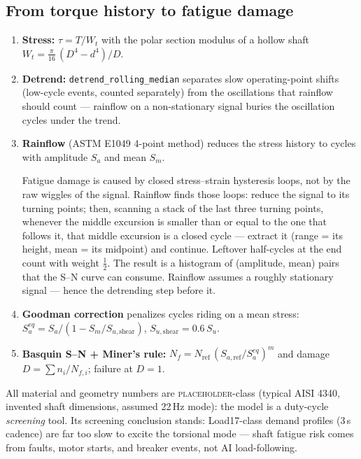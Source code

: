 \documentclass[11pt]{article}
\begin{document}
\subsection{From torque history to fatigue damage}
\begin{enumerate}[nosep]
\item \textbf{Stress:} $\tau = T/W_t$ with the polar section modulus of a
  hollow shaft $W_t = \tfrac{\pi}{16}\,(D^4 - d^4)/D$.
\item \textbf{Detrend:} \texttt{detrend\_rolling\_median} separates slow
  operating-point shifts (low-cycle events, counted separately) from the
  oscillations that rainflow should count --- rainflow on a non-stationary
  signal buries the oscillation cycles under the trend.
\item \textbf{Rainflow} (ASTM E1049 4-point method) reduces the stress
  history to cycles with amplitude $S_a$ and mean $S_m$.
  \begin{novicebox}
  Fatigue damage is caused by closed stress--strain hysteresis loops, not
  by the raw wiggles of the signal. Rainflow finds those loops: reduce the
  signal to its turning points; then, scanning a stack of the last three
  turning points, whenever the middle excursion is smaller than or equal
  to the one that follows it, that middle excursion is a closed cycle ---
  extract it (range = its height, mean = its midpoint) and continue.
  Leftover half-cycles at the end count with weight $\tfrac12$. The result
  is a histogram of (amplitude, mean) pairs that the S--N curve can
  consume. Rainflow assumes a roughly stationary signal --- hence the
  detrending step before it.
  \end{novicebox}
\item \textbf{Goodman correction} penalizes cycles riding on a mean
  stress: $S_a^{eq} = S_a / (1 - S_m/S_{u,\text{shear}})$,
  $S_{u,\text{shear}} = 0.6\,S_u$.
\item \textbf{Basquin S--N + Miner's rule:}
  $N_f = N_\text{ref}\,(S_{a,\text{ref}}/S_a^{eq})^{m}$ and damage $D =
  \sum n_i/N_{f,i}$; failure at $D = 1$.
\end{enumerate}
All material and geometry numbers are \textsc{placeholder}-class (typical
AISI 4340, invented shaft dimensions, assumed 22\,Hz mode): the model is a
duty-cycle \emph{screening} tool. Its screening conclusion stands:
Load17-class demand profiles (3\,s cadence) are far too slow to excite the
torsional mode --- shaft fatigue risk comes from faults, motor starts, and
breaker events, not AI load-following.
\end{document}
